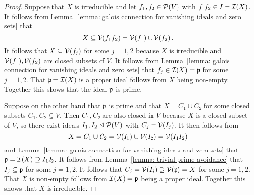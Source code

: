 \begin{proof}
  Suppose that $X$ is irreducible and let $f_1, f_2 \in \mathcal{P}(V)$ with $f_1 f_2 \in I = \mathcal{I}(X)$.
  It follows from Lemma~\ref{lemma: galois connection for vanishing ideals and zero sets} that
  \[
              X
    \subseteq \mathcal{V}(f_1 f_2)
    =         \mathcal{V}(f_1) \cup \mathcal{V}(f_2) \,.
  \]
  It follows that $X \subseteq \mathcal{V}(f_j)$ for some $j = 1,2$ because $X$ is irreducible and $\mathcal{V}(f_1), \mathcal{V}(f_2)$ are closed subsets of $V$.
  It follows from Lemma~\ref{lemma: galois connection for vanishing ideals and zero sets} that $f_j \in \mathcal{I}(X) = \mathfrak{p}$ for some $j = 1,2$.
  That $\mathfrak{p} = \mathcal{I}(X)$ is a proper ideal follows from $X$ being non-empty.
  Together this shows that the ideal $\mathfrak{p}$ is prime.
  
  Suppose on the other hand that $\mathfrak{p}$ is prime and that $X = C_1 \cup C_2$ for some closed subsets $C_1, C_2 \subseteq V$.
  Then $C_1, C_2$ are also closed in $V$ because $X$ is a closed subset of $V$, so there exist ideals $I_1, I_2 \trianglelefteq \mathcal{P}(V)$ with $C_j = \mathcal{V}(I_j)$.
  It then follows from
  \[
      X
    = C_1 \cup C_2
    = \mathcal{V}(I_1) \cup \mathcal{V}(I_2)
    = \mathcal{V}(I_1 I_2)
  \]
  and Lemma~\ref{lemma: galois connection for vanishing ideals and zero sets} that $\mathfrak{p} = \mathcal{I}(X) \supseteq I_1 I_2$.
  It follows from Lemma~\ref{lemma: trivial prime avoidance} that $I_j \subseteq \mathfrak{p}$ for some $j = 1,2$.
  It follows that $C_j = \mathcal{V}(I_j) \supseteq \mathcal{V}(\mathfrak{p}) = X$ for some $j = 1,2$.
  That $X$ is non-empty follows from $\mathcal{I}(X) = \mathfrak{p}$ being a proper ideal.
  Together this shows that $X$ is irreducible.
\end{proof}


